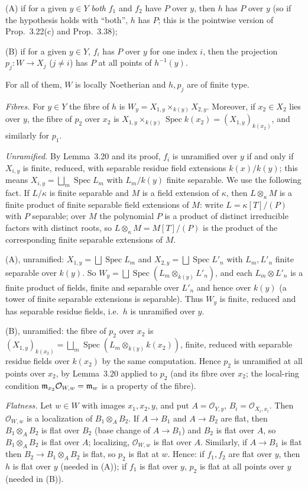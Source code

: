 \documentclass[11pt]{article}
\begin{document}
(A) if for a given $y\in Y$ \emph{both} $f_1$ and $f_2$ have $P$ over $y$, then $h$ has $P$ over $y$ (so if the hypothesis holds with ``both'', $h$ has $P$; this is the pointwise version of Prop.~3.22(c) and Prop.~3.38);

(B) if for a given $y\in Y$, $f_i$ has $P$ over $y$ for one index $i$, then the projection $p_j:W\to X_j$ ($j\ne i$) has $P$ at all points of $h^{-1}(y)$.

For all of them, $W$ is locally Noetherian and $h,p_j$ are of finite type.

\emph{Fibres.} For $y\in Y$ the fibre of $h$ is $W_y=X_{1,y}\times_{k(y)}X_{2,y}$. Moreover, if $x_2\in X_2$ lies over $y$, the fibre of $p_2$ over $x_2$ is $X_{1,y}\times_{k(y)}\operatorname{Spec}k(x_2)=(X_{1,y})_{k(x_2)}$, and similarly for $p_1$.

\emph{Unramified.} By Lemma~3.20 and its proof, $f_i$ is unramified over $y$ if and only if $X_{i,y}$ is finite, reduced, with separable residue field extensions $k(x)/k(y)$; this means $X_{i,y}=\bigsqcup_m\operatorname{Spec}L_m$ with $L_m/k(y)$ finite separable. We use the following fact. If $L/\kappa$ is finite separable and $M$ is a field extension of $\kappa$, then $L\otimes_\kappa M$ is a finite product of finite separable field extensions of $M$: write $L=\kappa[T]/(P)$ with $P$ separable; over $M$ the polynomial $P$ is a product of distinct irreducible factors with distinct roots, so $L\otimes_\kappa M=M[T]/(P)$ is the product of the corresponding finite separable extensions of $M$.

(A), unramified: $X_{1,y}=\bigsqcup\operatorname{Spec}L_m$ and $X_{2,y}=\bigsqcup\operatorname{Spec}L'_n$ with $L_m,L'_n$ finite separable over $k(y)$. So $W_y=\bigsqcup\operatorname{Spec}(L_m\otimes_{k(y)}L'_n)$, and each $L_m\otimes L'_n$ is a finite product of fields, finite and separable over $L'_n$ and hence over $k(y)$ (a tower of finite separable extensions is separable). Thus $W_y$ is finite, reduced and has separable residue fields, i.e.\ $h$ is unramified over $y$.

(B), unramified: the fibre of $p_2$ over $x_2$ is $(X_{1,y})_{k(x_2)}=\bigsqcup_m\operatorname{Spec}(L_m\otimes_{k(y)}k(x_2))$, finite, reduced with separable residue fields over $k(x_2)$ by the same computation. Hence $p_2$ is unramified at all points over $x_2$, by Lemma~3.20 applied to $p_2$ (and its fibre over $x_2$; the local-ring condition $\mathfrak m_{x_2}\mathcal O_{W,w}=\mathfrak m_w$ is a property of the fibre).

\emph{Flatness.} Let $w\in W$ with images $x_1,x_2,y$, and put $A=\mathcal O_{Y,y}$, $B_i=\mathcal O_{X_i,x_i}$. Then $\mathcal O_{W,w}$ is a localization of $B_1\otimes_AB_2$. If $A\to B_1$ and $A\to B_2$ are flat, then $B_1\otimes_AB_2$ is flat over $B_2$ (base change of $A\to B_1$) and $B_2$ is flat over $A$, so $B_1\otimes_AB_2$ is flat over $A$; localizing, $\mathcal O_{W,w}$ is flat over $A$. Similarly, if $A\to B_1$ is flat then $B_2\to B_1\otimes_AB_2$ is flat, so $p_2$ is flat at $w$. Hence: if $f_1,f_2$ are flat over $y$, then $h$ is flat over $y$ (needed in (A)); if $f_1$ is flat over $y$, $p_2$ is flat at all points over $y$ (needed in (B)).
\end{document}

